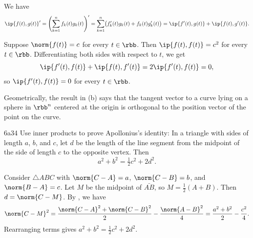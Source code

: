 \begin{solenum}
    \item We have
    \[
        \ip{f(t), g(t)}' = \left(\sum_{k=1}^n f_k(t)g_k(t)\right)' = \sum_{k=1}^n \bigl(f_k'(t)g_k(t) + f_k(t)g_k'(t)\bigr) = \ip{f'(t), g(t)} + \ip{f(t), g'(t)}.
    \]
    \item Suppose $\norm{f(t)} = c$ for every $t \in \rbb$.
    Then $\ip{f(t), f(t)} = c^2$ for every $t \in \rbb$.
    Differentiating both sides with respect to $t$, we get
    \[
        \ip{f'(t), f(t)} + \ip{f(t), f'(t)} = 2\ip{f'(t), f(t)} = 0,
    \]
    so $\ip{f'(t), f(t)} = 0$ for every $t \in \rbb$.
    \item Geometrically, the result in (b) says that the tangent vector to a curve lying on a sphere in $\rbb^n$ centered at the origin is orthogonal to the position vector of the point on the curve.
\end{solenum}

\begin{exercise}{6a34}
    Use inner products to prove Apollonius's identity: In a triangle with sides of length $a$, $b$, and $c$, let $d$ be the length of the line segment from the midpoint of the side of length $c$ to the opposite vertex.
    Then
    \[
        a^2 + b^2 = \tfrac{1}{2}c^2 + 2d^2.
    \]
    \begin{center}
    \end{center}
\end{exercise}

\begin{sol}
    Consider $\triangle ABC$ with $\norm{C - A} = a$, $\norm{C - B} = b$, and $\norm{B - A} = c$.
    Let $M$ be the midpoint of $\bar{AB}$, so $M = \frac{1}{2}(A + B)$.
    Then $d = \norm{C - M}$.
    By , we have
    \[
        \norm{C - M}^2 = \frac{\norm{C - A}^2 + \norm{C - B}^2}{2} - \frac{\norm{A - B}^2}{4} = \frac{a^2 + b^2}{2} - \frac{c^2}{4}.
    \]
    Rearranging terms gives $a^2 + b^2 = \frac{1}{2}c^2 + 2d^2$.
\end{sol}

